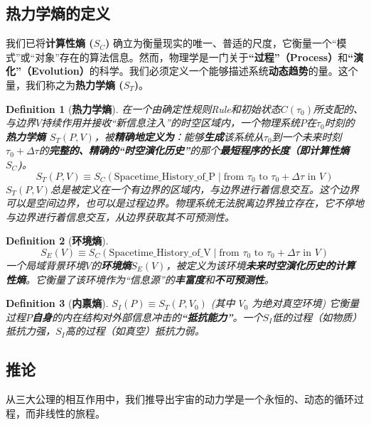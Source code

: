 \documentclass[11pt, a4paper]{article}
\newtheorem{definition}{Definition}[section]
\begin{document}
\subsection*{热力学熵的定义}
我们已将\textbf{计算性熵 ($S_C$)} 确立为衡量现实的唯一、普适的尺度，它衡量一个“模式”或“对象”存在的算法信息。然而，物理学是一门关于\textbf{“过程”（Process）}和\textbf{“演化”（Evolution）}的科学。我们必须定义一个能够描述系统\textbf{动态趋势}的量。这个量，我们称之为\textbf{热力学熵 ($S_T$)}。

\begin{definition}[\textbf{热力学熵}]
在一个由确定性规则Rule和初始状态$C(\tau_0)$所支配的、与边界$V$持续作用并接收“新信息注入”的时空区域内，一个物理系统$P$在$\tau_0$时刻的\textbf{热力学熵 $S_T(P, V)$}，被\textbf{精确地定义为}：能够\textbf{生成}该系统从$\tau_0$到一个未来时刻$\tau_0+\Delta\tau$的\textbf{完整的、精确的“时空演化历史”}的那个\textbf{最短程序的长度（即计算性熵 $S_C$)}。
\[
S_T(P, V) \equiv S_C( \text{Spacetime\_History\_of\_P} \mid \text{from } \tau_0 \text{ to } \tau_0+\Delta\tau \text{ in } V )
\]
$S_T(P, V)$总是被定义在一个有边界的区域内，与边界进行着信息交互。这个边界可以是空间边界，也可以是过程边界。物理系统无法脱离边界独立存在，它不停地与边界进行着信息交互，从边界获取其不可预测性。
\end{definition}

\begin{definition}[\textbf{环境熵}]
\[
S_E(V) \equiv S_C( \text{Spacetime\_History\_of\_V} \mid \text{from } \tau_0 \text{ to } \tau_0+\Delta\tau \text{ in } V )
\]
一个局域背景环境$V$的\textbf{环境熵$S_E(V)$}，被定义为该环境\textbf{未来时空演化历史的计算性熵}。它衡量了该环境作为“信息源”的\textbf{丰富度}和\textbf{不可预测性}。
\end{definition}

\begin{definition}[\textbf{内禀熵}]
$S_I(P) \equiv S_T(P, V_0)$ (其中 $V_0$ 为绝对真空环境)
它衡量过程$P$\textbf{自身}的内在结构对外部信息冲击的\textbf{“抵抗能力”}。一个$S_I$低的过程（如物质）抵抗力强，$S_I$高的过程（如真空）抵抗力弱。
\end{definition}

\subsection*{推论}
从三大公理的相互作用中，我们推导出宇宙的动力学是一个永恒的、动态的循环过程，而非线性的旅程。
\end{document}
